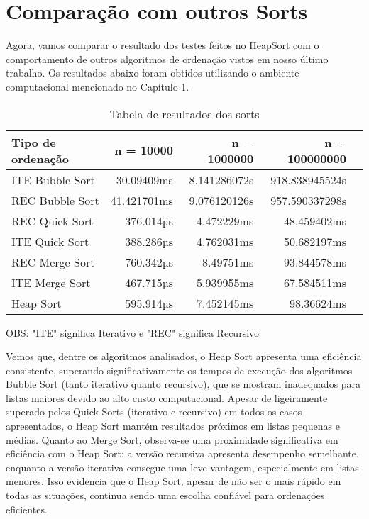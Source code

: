 \section*{Comparação com outros Sorts}

Agora, vamos comparar o resultado dos testes feitos no HeapSort com o comportamento de outros algoritmos de ordenação vistos em nosso último trabalho. Os resultados abaixo foram obtidos utilizando o ambiente computacional mencionado no Capítulo 1.

\begin{table}[h!]
	\centering
	\caption{Tabela de resultados dos sorts}
	\label{tab:sorts_result}
	\begin{tabular}{lrrrr}
		\toprule
		Tipo de ordenação   & n = 10000   & n = 1000000  & n = 100000000 \\
		\midrule
	ITE Bubble Sort & 30.09409ms & 8.141286072s & 918.838945524s \\
    REC Bubble Sort & 41.421701ms & 9.076120126s & 957.590337298s \\
    REC Quick Sort  & 376.014µs & 4.472229ms   & 48.459402ms \\
    ITE Quick Sort  & 388.286µs & 4.762031ms   & 50.682197ms \\
    REC Merge Sort  & 760.342µs & 8.49751ms    & 93.844578ms \\
    ITE Merge Sort  & 467.715µs & 5.939955ms   & 67.584511ms \\
		\midrule
		Heap Sort       & 595.914µs & 7.452145ms   & 98.36624ms \\
		\bottomrule
	\end{tabular}
\end{table}

OBS: "ITE" significa Iterativo e "REC" significa Recursivo  

Vemos que, dentre os algoritmos analisados, o Heap Sort apresenta uma eficiência consistente, superando significativamente os tempos de execução dos algoritmos Bubble Sort (tanto iterativo quanto recursivo), que se mostram inadequados para listas maiores devido ao alto custo computacional. Apesar de ligeiramente superado pelos Quick Sorts (iterativo e recursivo) em todos os casos apresentados, o Heap Sort mantém resultados próximos em listas pequenas e médias. Quanto ao Merge Sort, observa-se uma proximidade significativa em eficiência com o Heap Sort: a versão recursiva apresenta desempenho semelhante, enquanto a versão iterativa consegue uma leve vantagem, especialmente em listas menores. Isso evidencia que o Heap Sort, apesar de não ser o mais rápido em todas as situações, continua sendo uma escolha confiável para ordenações eficientes.

% 
%
